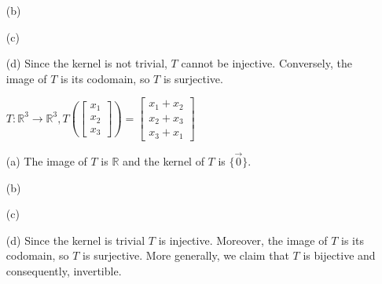 \begin{SaveQuestion}
\begin{enumerate}
\begin{itemize}
            \item[(b)]
            \item[(c)]
            \item[(d)] Since the kernel is not trivial, $T$ cannot be injective. Conversely, the image of $T$ is its codomain, so $T$ is surjective. 
            \item[] $T: \mathbb{R}^3 \rightarrow \mathbb{R}^3, T \left(\begin{bmatrix} x_1 \\ x_2 \\ x_3 \end{bmatrix}\right) = \begin{bmatrix} x_1 + x_2 \\ x_2 + x_3 \\ x_3 + x_1 \end{bmatrix}$ \\
            \item[(a)] The image of $T$ is $\mathbb{R}$ and the kernel of $T$ is $\{\vec 0\}$.
            \item[(b)]
            \item[(c)]
            \item[(d)] Since the kernel is trivial $T$ is injective. Moreover, the image of $T$ is its codomain, so $T$ is surjective. More generally, we claim that $T$ is bijective and consequently, invertible.  
        \end{itemize}
    \end{enumerate}
\end{SaveQuestion}


